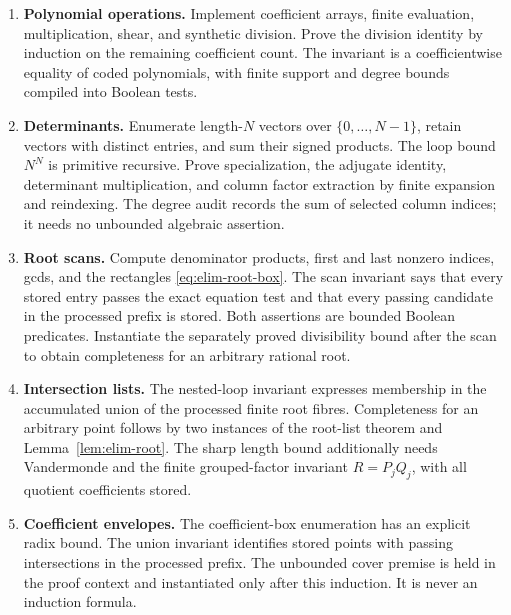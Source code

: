 \begin{enumerate}
\item \textbf{Polynomial operations.}  Implement coefficient arrays,
finite evaluation, multiplication, shear, and synthetic division.  Prove
the division identity by induction on the remaining coefficient count.
The invariant is a coefficientwise equality of coded polynomials, with
finite support and degree bounds compiled into Boolean tests.
\item \textbf{Determinants.}  Enumerate length-\(N\) vectors over
\(\{0,\ldots,N-1\}\), retain vectors with distinct entries, and sum
their signed products.  The loop bound \(N^N\) is primitive recursive.
Prove specialization, the adjugate identity, determinant multiplication,
and column factor extraction by finite expansion and reindexing.  The
degree audit records the sum of selected column indices; it needs no
unbounded algebraic assertion.
\item \textbf{Root scans.}  Compute denominator products, first and last
nonzero indices, gcds, and the rectangles
\eqref{eq:elim-root-box}.  The scan invariant says that every stored
entry passes the exact equation test and that every passing candidate in
the processed prefix is stored.  Both assertions are bounded Boolean
predicates.  Instantiate the separately proved divisibility bound after
the scan to obtain completeness for an arbitrary rational root.
\item \textbf{Intersection lists.}  The nested-loop invariant expresses
membership in the accumulated union of the processed finite root
fibres.  Completeness for an arbitrary point follows by two instances of
the root-list theorem and Lemma~\ref{lem:elim-root}.  The sharp length
bound additionally needs Vandermonde and the finite grouped-factor
invariant \(R=P_jQ_j\), with all quotient coefficients stored.
\item \textbf{Coefficient envelopes.}  The coefficient-box enumeration
has an explicit radix bound.  The union invariant identifies stored
points with passing intersections in the processed prefix.  The
unbounded cover premise is held in the proof context and instantiated
only after this induction.  It is never an induction formula.
\end{enumerate}

